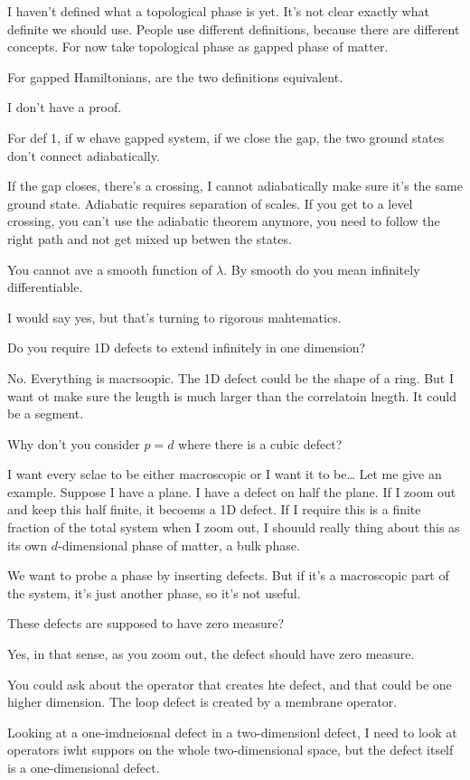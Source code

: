 I haven't defined what a topological phase is yet.
It's not clear exactly what definite we should use.
People use different definitions,
because there are different concepts.
For now take topological phase as gapped phase of matter.

\begin{question}
    For gapped Hamiltonians, are the two definitions equivalent.
\end{question}
I don't have a proof.

\begin{question}
    For def 1, if w ehave gapped system, if we close the gap, the two ground
    states don't connect adiabatically.
\end{question}
If the gap closes, there's a crossing, I cannot adiabatically make sure it's
the same ground state.
Adiabatic requires separation of scales.
If you get to a level crossing, you can't use the adiabatic theorem anymore,
you need to follow the right path and not get mixed up betwen the states.


\begin{question}
    You cannot ave a smooth function of $\lambda$.
    By smooth do you mean infinitely differentiable.
\end{question}
I would say yes, but that's turning to rigorous mahtematics.


\begin{question}
    Do you require 1D defects to extend infinitely in one dimension?
\end{question}
No. Everything is macrsoopic.
The 1D defect could be the shape of a ring.
But I want ot make sure the length is much larger than the correlatoin lnegth.
It could be a segment.

\begin{question}
    Why don't you consider $p=d$ where there is a cubic defect?
\end{question}
I want every sclae to be either macroscopic or I want it to be\ldots
Let me give an example.
Suppose I have a plane.
I have a defect on half the plane.
If I zoom out and keep this half finite, it becoems a 1D defect.
If I require this is a finite fraction of the total system when I zoom out,
I shouuld really thing about this as its own $d$-dimensional phase of matter,
a bulk phase.

We want to probe a phase by inserting defects.
But if it's a macroscopic part of the system,
it's just another phase, so it's not useful.


\begin{question}
    These defects are supposed to have zero measure?
\end{question}
Yes, in that sense, as you zoom out, the defect should have zero measure.


You could ask about the operator that creates hte defect,
and that could be one higher dimension.
The loop defect is created by a membrane operator.

Looking at a one-imdneiosnal defect in a two-dimensionl defect,
I need to look at operators iwht suppors on the whole two-dimensional space,
but the defect itself is a one-dimensional defect.
